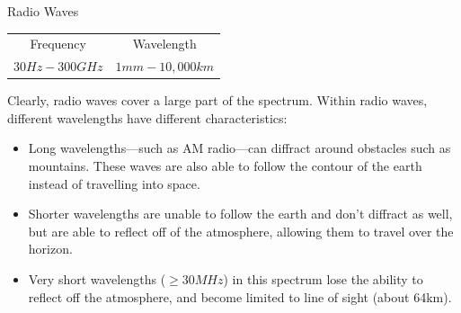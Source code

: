 \documentclass{beamer}
\begin{document}
\begin{frame}{Radio Waves}
	\begin{center}
	\begin{tabular}{c c}
		Frequency & Wavelength \\
		$30 Hz - 300 GHz$ & $1 mm - 10,000 km$ \\	
	\end{tabular}
	\end{center}
	Clearly, radio waves cover a large part of the spectrum. Within radio waves, different wavelengths have different characteristics:
	\begin{itemize}
		\item Long wavelengths---such as AM radio---can diffract around obstacles such as mountains. These waves are also able to follow the contour of the earth instead of travelling into space. 
		\item Shorter wavelengths are unable to follow the earth and don't diffract as well, but are able to reflect off of the atmosphere, allowing them to travel over the horizon.
		\item Very short wavelengths ($\geq 30 MHz$) in this spectrum lose the ability to reflect off the atmosphere, and become limited to \alert{line of sight} (about 64km).  
	\end{itemize}
\end{frame}
\end{document}
